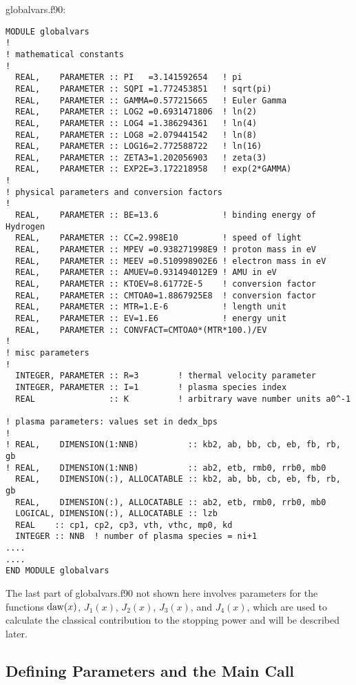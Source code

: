\documentclass[preprint,12pt,eqsecnum,nofootinbib,amsmath,amssymb]{revtex4}
\begin{document}
\pagebreak
{
\noindent
globalvars.f90:
\baselineskip12pt
\begin{verbatim}
MODULE globalvars
!
! mathematical constants
!
  REAL,    PARAMETER :: PI   =3.141592654   ! pi
  REAL,    PARAMETER :: SQPI =1.772453851   ! sqrt(pi)
  REAL,    PARAMETER :: GAMMA=0.577215665   ! Euler Gamma
  REAL,    PARAMETER :: LOG2 =0.6931471806  ! ln(2)
  REAL,    PARAMETER :: LOG4 =1.386294361   ! ln(4)
  REAL,    PARAMETER :: LOG8 =2.079441542   ! ln(8)
  REAL,    PARAMETER :: LOG16=2.772588722   ! ln(16)
  REAL,    PARAMETER :: ZETA3=1.202056903   ! zeta(3)
  REAL,    PARAMETER :: EXP2E=3.172218958   ! exp(2*GAMMA)
!
! physical parameters and conversion factors
!
  REAL,    PARAMETER :: BE=13.6             ! binding energy of Hydrogen
  REAL,    PARAMETER :: CC=2.998E10         ! speed of light
  REAL,    PARAMETER :: MPEV =0.938271998E9 ! proton mass in eV
  REAL,    PARAMETER :: MEEV =0.510998902E6 ! electron mass in eV
  REAL,    PARAMETER :: AMUEV=0.931494012E9 ! AMU in eV
  REAL,    PARAMETER :: KTOEV=8.61772E-5    ! conversion factor
  REAL,    PARAMETER :: CMTOA0=1.8867925E8  ! conversion factor
  REAL,    PARAMETER :: MTR=1.E-6           ! length unit
  REAL,    PARAMETER :: EV=1.E6             ! energy unit
  REAL,    PARAMETER :: CONVFACT=CMTOA0*(MTR*100.)/EV
!
! misc parameters
!
  INTEGER, PARAMETER :: R=3        ! thermal velocity parameter
  INTEGER, PARAMETER :: I=1        ! plasma species index
  REAL               :: K          ! arbitrary wave number units a0^-1 

! plasma parameters: values set in dedx_bps
!
! REAL,    DIMENSION(1:NNB)          :: kb2, ab, bb, cb, eb, fb, rb, gb
! REAL,    DIMENSION(1:NNB)          :: ab2, etb, rmb0, rrb0, mb0
  REAL,    DIMENSION(:), ALLOCATABLE :: kb2, ab, bb, cb, eb, fb, rb, gb
  REAL,    DIMENSION(:), ALLOCATABLE :: ab2, etb, rmb0, rrb0, mb0
  LOGICAL, DIMENSION(:), ALLOCATABLE :: lzb
  REAL    :: cp1, cp2, cp3, vth, vthc, mp0, kd
  INTEGER :: NNB  ! number of plasma species = ni+1
....
....
END MODULE globalvars
\end{verbatim}
}

\vskip0.5cm
\noindent
The last part of globalvars.f90 not shown here involves 
parameters
for the functions ${\rm daw}(x)$, $J_1(x)$, $J_2(x)$,
$J_3(x)$, and $J_4(x)$, which are used to calculate the
classical contribution to the stopping power and will be 
described later.

\subsection{Defining Parameters and the Main Call}
\end{document}
